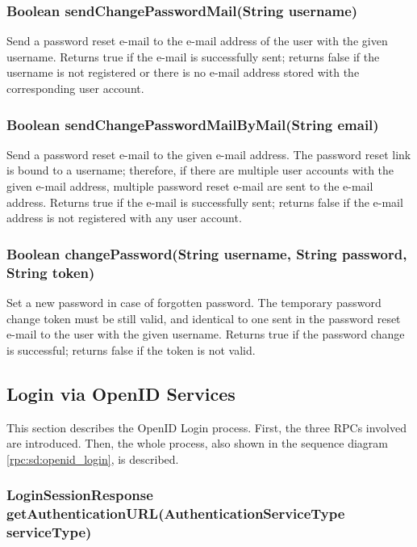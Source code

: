 {\subsubsection{Boolean sendChangePasswordMail(String username)}
Send a password reset e-mail
to the e-mail address of the user with the given username.
Returns true if the e-mail is successfully sent;
returns false if the username is not registered or there is no e-mail address stored with the corresponding user account.

\subsubsection{Boolean sendChangePasswordMailByMail(String email)}
Send a password reset e-mail to the given e-mail address.
The password reset link is bound to a username;
therefore, if there are multiple user accounts with the given e-mail address,
multiple password reset e-mail are sent to the e-mail address.
Returns true if the e-mail is successfully sent;
returns false if the e-mail address is not registered with any user account.

\subsubsection{Boolean changePassword(String username, String password, String token)}
\label{sec:rpc_changePassword}
Set a new password in case of forgotten password.
The temporary password change token must be still valid,
and identical to one sent in the password reset e-mail
to the user with the given username.
Returns true if the password change is successful;
returns false if the token is not valid.

\subsection{Login via OpenID Services}
\label{subsubsec:gui_openid}

This section describes the OpenID Login process. First, the three RPCs involved are introduced. Then, the whole process, also shown in the sequence diagram \ref{rpc:sd:openid_login}, is described.

\subsubsection{LoginSessionResponse getAuthenticationURL(AuthenticationServiceType serviceType)}
\label{sec:rpc_getAuthenticationURL}

}
